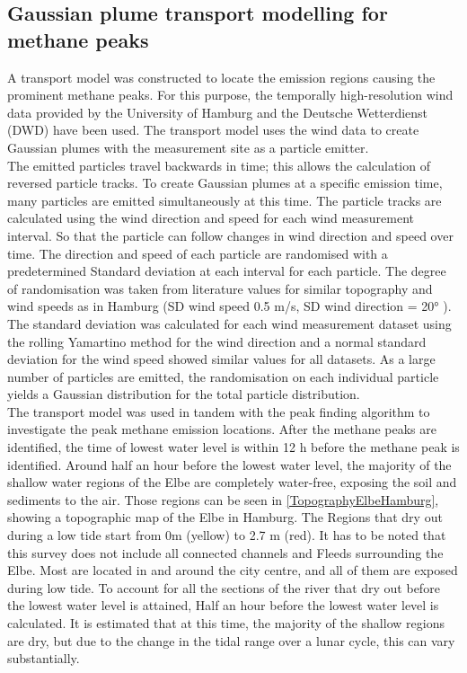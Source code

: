 \subsection{Gaussian plume transport modelling for methane peaks}
A transport model was constructed to locate the emission regions causing the prominent methane peaks. For this purpose, the temporally high-resolution wind data provided by the University of Hamburg and the Deutsche Wetterdienst (DWD) have been used. The transport model uses the wind data to create Gaussian plumes with the measurement site as a particle emitter.\\
The emitted particles travel backwards in time; this allows the calculation of reversed particle tracks. To create Gaussian plumes at a specific emission time, many particles are emitted simultaneously at this time. The particle tracks are calculated using the wind direction and speed for each wind measurement interval. So that the particle can follow changes in wind direction and speed over time. The direction and speed of each particle are randomised with a predetermined Standard deviation at each interval for each particle. The degree of randomisation was taken from literature values for similar topography and wind speeds as in Hamburg (SD wind speed 0.5 m/s, SD wind direction = 20° \cite{Farrugia.2017}). The standard deviation was calculated for each wind measurement dataset using the rolling Yamartino method for the wind direction and a normal standard deviation for the wind speed showed similar values for all datasets. As a large number of particles are emitted, the randomisation on each individual particle yields a Gaussian distribution for the total particle distribution.\\
The transport model was used in tandem with the peak finding algorithm to investigate the peak methane emission locations. After the methane peaks are identified, the time of lowest water level is within 12 h before the methane peak is identified. 
Around half an hour before the lowest water level, the majority of the shallow water regions of the Elbe are completely water-free, exposing the soil and sediments to the air. Those regions can be seen in \cref{TopographyElbeHamburg}, showing a topographic map of the Elbe  in Hamburg. The Regions that dry out during a low tide start from 0m (yellow) to 2.7 m (red). It has to be noted that this survey does not include all connected channels and Fleeds surrounding the Elbe. Most are located in and around the city centre, and all of them are exposed during low tide. To account for all the sections of the river that dry out before the lowest water level is attained, Half an hour before the lowest water level is calculated. It is estimated that at this time, the majority of the shallow regions are dry, but due to the change in the tidal range over a lunar cycle, this can vary substantially.
